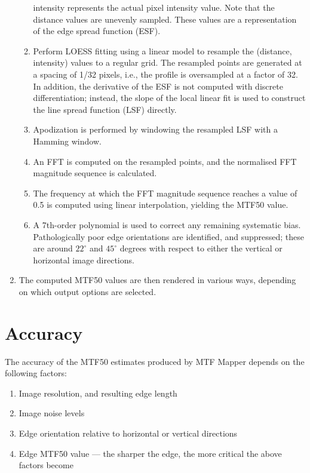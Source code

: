 \documentclass[a4paper]{article}
\begin{document}
\begin{enumerate}
\begin{enumerate}
\textsf{intensity} represents the actual pixel intensity value. Note that
the distance values are unevenly sampled. These values are a representation
of the edge spread function (ESF).
	  \item Perform LOESS fitting using a linear model to resample the 
(\textsf{distance}, \textsf{intensity}) values to a regular grid. The
resampled points are generated at a spacing of 1/32 pixels, i.e., the
profile is oversampled at a factor of 32. In addition, the derivative of the
ESF is not computed with discrete differentiation; instead, the slope of the
local linear fit is used to construct the line spread function (LSF) directly.
	  \item Apodization is performed by windowing the resampled LSF with
a Hamming window.
	  \item An FFT is computed on the resampled points, and the
normalised FFT magnitude sequence is calculated.
	  \item The frequency at which the FFT magnitude sequence reaches a
value of 0.5 is computed using linear interpolation, yielding the MTF50
value.
	  \item A 7th-order polynomial is used to correct any remaining
systematic bias. Pathologically poor edge orientations are identified, and
suppressed; these are around $22^\circ$ and $45^\circ$ degrees with respect
to either the vertical or horizontal image directions.
	\end{enumerate}
    \item The computed MTF50 values are then rendered in various ways,
depending on which output options are selected.
\end{enumerate}

\section{Accuracy}
The accuracy of the MTF50 estimates produced by MTF Mapper depends on the
following factors:
\begin{enumerate}
  \item Image resolution, and resulting edge length
  \item Image noise levels
  \item Edge orientation relative to horizontal or vertical directions
  \item Edge MTF50 value --- the sharper the edge, the more critical the
  above factors become
\end{enumerate}
\end{document}

